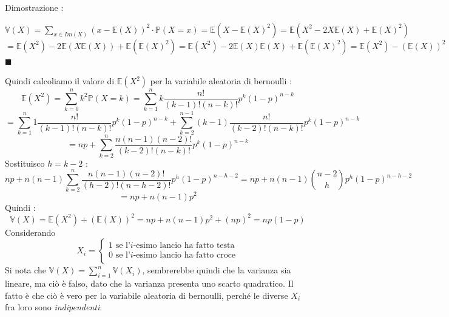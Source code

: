\documentclass[12pt, letterpaper]{article}
\newcommand{\E}{{\mathbb E}}
\newcommand{\V}{{\mathbb V}}
\newcommand{\Prob}{{\mathbb P}}
\begin{document}
Dimostrazione :\begin{center}\(
    \V(X)=\displaystyle\sum_{x\in Im(X)}(x-\mathbb{E}(X))^2\cdot\Prob(X=x)  =\E(X-\E(X)^2)=\E(X^2-2X\E(X)+\E(X)^2)
\)\\\(
    =\E(X^2)-2\E(X\E(X))+\E(\E(X)^2)=\E(X^2)-2\E(X)\E(X)+\E(\E(X)^2)=\E(X^2)-(\E(X))^2\) \(\blacksquare\)
\end{center}
Quindi calcoliamo il valore di \(\E(X^2)\) per la variabile aleatoria di bernoulli :
\begin{equation}
    \E(X^2)=\sum_{k=0}^nk^2\Prob(X=k)=\sum_{k=1}^nk\dfrac{n!}{(k-1)!(n-k)!}p^k(1-p)^{n-k}
\end{equation}
\begin{equation}
    =\sum_{k=1}^n1\dfrac{n!}{(k-1)!(n-k)!}p^k(1-p)^{n-k}+\sum_{k=2}^{n-1}(k-1)\dfrac{n!}{(k-2)!(n-k)!}p^k(1-p)^{n-k}
\end{equation}\begin{equation}
    =np+\sum_{k=2}^n\dfrac{n(n-1)(n-2)!}{(k-2)!(n-k)!}p^k(1-p)^{n-k}
\end{equation}
Sostituisco \(h=k-2\) : \begin{equation}
    np+n(n-1)\sum_{k=2}^n\dfrac{n(n-1)(n-2)!}{(h-2)!(n-h-2)!}p^h(1-p)^{n-h-2}=np+n(n-1)\binom{n-2}{h}p^h(1-p)^{n-h-2}
\end{equation}
\begin{equation}
    =np+n(n-1)p^2
\end{equation}
Quindi :\begin{equation}
    \V(X)=\E(X^2)+(\E(X))^2=np+n(n-1)p^2+(np)^2=np(1-p)
\end{equation}
Considerando \begin{equation}
    X_i=\begin{cases}
        1 \text{ se l'}i\text{-esimo lancio ha fatto testa}\\
        0 \text{ se l'}i\text{-esimo lancio ha fatto croce}\\
    \end{cases}
\end{equation}
Si nota che \(\V(X)=\displaystyle\sum_{i=1}^n\V(X_i)\), sembrerebbe quindi che la varianza sia lineare, ma ciò 
è falso, dato che la varianza presenta uno scarto quadratico. Il fatto è che ciò è vero per la variabile
aleatoria di bernoulli, perché le diverse \(X_i\) fra loro sono \textit{indipendenti}.
\end{document}
